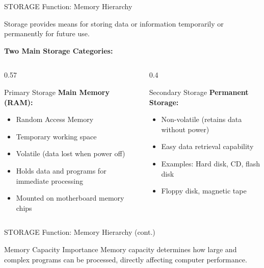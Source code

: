 \documentclass[aspectratio=169]{beamer}
\begin{document}
\begin{frame}{STORAGE Function: Memory Hierarchy}
    \begin{definition}
        Storage provides means for storing data or information temporarily or permanently for future use.
    \end{definition} 
    \vspace{0.3cm}
    \textbf{Two Main Storage Categories:} 
    \begin{columns}
        \begin{column}{0.57\textwidth}
            \begin{block}{Primary Storage}
                \textbf{Main Memory (RAM):}
                \begin{itemize}
                    \item Random Access Memory
                    \item Temporary working space
                    \item Volatile (data lost when power off)
                    \item Holds data and programs for immediate processing
                    \item Mounted on motherboard memory chips
                \end{itemize}
            \end{block}
        \end{column}
        \begin{column}{0.4\textwidth}
            \begin{block}{Secondary Storage}
                \textbf{Permanent Storage:}
                \begin{itemize}
                    \item Non-volatile (retains data without power)
                    \item Easy data retrieval capability
                    \item Examples: Hard disk, CD, flash disk
                    \item Floppy disk, magnetic tape
                \end{itemize}
            \end{block}
        \end{column}
    \end{columns}
   
\end{frame}


\begin{frame}{STORAGE Function: Memory Hierarchy (cont.)} 
    \begin{alertblock}{Memory Capacity Importance}
        Memory capacity determines how large and complex programs can be processed, directly affecting computer performance.
    \end{alertblock}
\end{frame}
\end{document}

